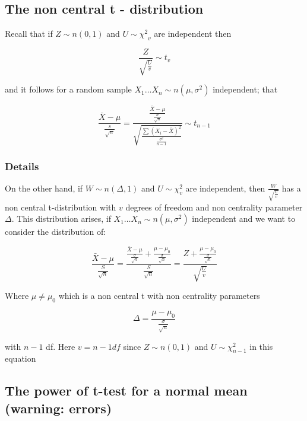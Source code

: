 \documentclass[12pt,a4paper]{article}
\theoremstyle{regla}
\theoremstyle{remark}
\theoremstyle{definition}
\theoremstyle{nonumberbreak}
\begin{document}
\subsection{The non central t - distribution}
\begin{fbox}
\begin{minipage}{0.97\textwidth}
Recall that if $Z \sim n(0, 1)$ and $ U \sim {\chi^2}_v$ are independent then

$$\frac{Z}{\sqrt{\frac{U}{v}}}\sim t_v$$

and it follows for a random sample $X_1 \ldots X_n \sim n(\mu, \sigma^2)$ independent; that


$$\frac{\bar {X} - \mu}{\frac{s} {\sqrt{n}}} = \frac{\frac{\bar {X} - \mu}{\frac{\sigma} {\sqrt{n}}}}{\sqrt{\frac{\sum ({X_i} -\bar {X})^2} { \frac {{\sigma}^2} {n-1}}}} \sim t_{n-1}$$

\end{minipage}
\end{fbox}
\subsubsection{Details}
On the other hand, if $W \sim n (\Delta,1) $ and $U \sim {\chi}^2_v $ are independent, then $\frac{W}{\sqrt{\frac{U}{v}}}$ has a non central t-distribution with $v$ degrees of freedom and non centrality parameter $\Delta$. This distribution arises, if $X_1 \ldots X_n \sim n(\mu, \sigma^2)$ independent and we want to consider the distribution of: 

$$\frac{\bar {X} - \mu}{\frac{S} {\sqrt{n}}} = \frac{\frac{\bar {X} - \mu}{\frac{\sigma} {\sqrt{n}}} + \frac{\mu - \mu_0 }{\frac{\sigma} {\sqrt{n}}}} {\frac{S}{\sqrt{n}}} = \frac {Z + \frac{\mu - \mu_0 }{\frac{\sigma} {\sqrt{n}}}}{\sqrt{\frac{U}{v}}}$$

Where $\mu \neq \mu_0$ which is a non central t with non centrality parameters

$$ \Delta = \frac{\mu - \mu_0 }{\frac{\sigma} {\sqrt{n}}}$$

with $n-1$ df. Here $ v = n-1 df$ since  $Z \sim n (0,1) $ and $U \sim {\chi}^2_{n-1} $ in this equation 




\subsection{The power of t-test for a normal mean (warning: errors)}
\end{document}
